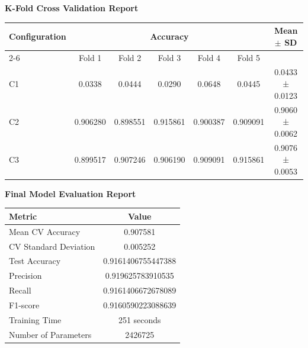 \documentclass[10pt]{article}
\begin{document}
\textbf{K-Fold Cross Validation Report}
\begin{center}
\begin{tabular}{|l|ccccc|c|}
\hline

Configuration &
\multicolumn{5}{c|}{Accuracy} &
Mean $\pm$ SD \\

\cline{2-6}

& Fold 1 & Fold 2 & Fold 3 & Fold 4 & Fold 5 & \\

\hline

C1 & 0.0338& 0.0444& 0.0290 &0.0648 &0.0445 & 0.0433 ± 0.0123 \\
C2 & 0.906280& 0.898551& 0.915861 &0.900387 & 0.909091 & 0.9060 ± 0.0062\\
C3 & 0.899517  & 0.907246 & 0.906190 & 0.909091 & 0.915861 & 0.9076 ± 0.0053 \\
\hline
\end{tabular}
\end{center}

\vspace{5mm}

\textbf{Final Model Evaluation Report}
\vspace{5mm}

\begin{center}
\begin{tabular}[H]{|l|c|}
\hline
Metric & Value\\
\hline
Mean CV Accuracy & 0.907581\\
CV Standard Deviation & 0.005252\\
Test Accuracy & 0.9161406755447388\\
Precision & 0.919625783910535\\
Recall & 0.9161406672678089\\
F1-score & 0.9160590223088639\\
Training Time & 251 seconds\\
Number of Parameters & 2426725\\
\hline
\end{tabular}
\end{center}
\vspace{5mm}
\end{document}
